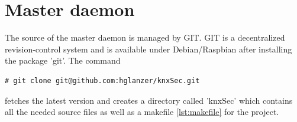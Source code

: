 \section{Master daemon}

The source of the master daemon is managed by GIT. GIT is a decentralized revision-control system and is available under Debian/Raspbian after installing
the package 'git'. The command

\begin{lstlisting}[style=BashInputStyle]
    # git clone git@github.com:hglanzer/knxSec.git
\end{lstlisting}

fetches the latest version and creates a directory called 'knxSec' which contains all the needed source files as well as a makefile \ref{lst:makefile}
for the project.